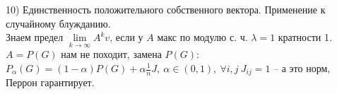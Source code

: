 10) Единственность положительного собственного вектора. Применение к случайному блужданию.\\
Знаем предел $\lim\limits_{k\to\infty}A^kv$, если у $ A $ макс по модулю с. ч. $\lambda=1$ кратности 1. $A=P(G)$ нам не походит, замена $P(G)$: $P_{\alpha}(G)=(1-\alpha) P(G) + \alpha\tfrac{1}{n}J,\ \alpha \in (0,1),\ \forall i,j\ J_{ij}=1 $ -- а это норм, Перрон гарантирует.\\
